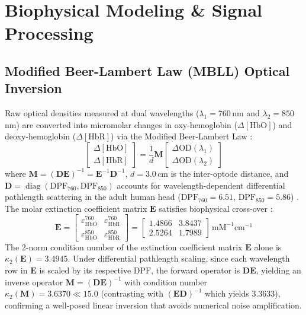 \documentclass[journal]{IEEEtran}
\begin{document}
\section{Biophysical Modeling \& Signal Processing}

\subsection{Modified Beer-Lambert Law (MBLL) Optical Inversion}
Raw optical densities measured at dual wavelengths ($\lambda_1 = 760$\,nm and $\lambda_2 = 850$\,nm) are converted into micromolar changes in oxy-hemoglobin ($\Delta[\text{HbO}]$) and deoxy-hemoglobin ($\Delta[\text{HbR}]$) via the Modified Beer-Lambert Law \cite{delpy1988estimation}:
\begin{equation}
\begin{bmatrix}
\Delta[\text{HbO}] \\
\Delta[\text{HbR}]
\end{bmatrix} = \frac{1}{d} \mathbf{M} \begin{bmatrix}
\Delta \text{OD}(\lambda_1) \\
\Delta \text{OD}(\lambda_2)
\end{bmatrix}
\end{equation}
where $\mathbf{M} = (\mathbf{D} \mathbf{E})^{-1} = \mathbf{E}^{-1} \mathbf{D}^{-1}$, $d = 3.0$\,cm is the inter-optode distance, and $\mathbf{D} = \operatorname{diag}(\text{DPF}_{760}, \text{DPF}_{850})$ accounts for wavelength-dependent differential pathlength scattering in the adult human head ($\text{DPF}_{760} = 6.51$, $\text{DPF}_{850} = 5.86$) \cite{duncan1995measurement, scholkmann2013general}. The molar extinction coefficient matrix $\mathbf{E}$ satisfies biophysical cross-over \cite{cope1991system}:
\begin{equation}
\mathbf{E} = \begin{bmatrix}
\varepsilon_{\text{HbO}}^{760} & \varepsilon_{\text{HbR}}^{760} \\
\varepsilon_{\text{HbO}}^{850} & \varepsilon_{\text{HbR}}^{850}
\end{bmatrix} = \begin{bmatrix}
1.4866 & 3.8437 \\
2.5264 & 1.7989
\end{bmatrix}\,\text{mM}^{-1}\text{cm}^{-1}
\end{equation}
The 2-norm condition number of the extinction coefficient matrix $\mathbf{E}$ alone is $\kappa_2(\mathbf{E}) = 3.4945$. Under differential pathlength scaling, since each wavelength row in $\mathbf{E}$ is scaled by its respective $\text{DPF}$, the forward operator is $\mathbf{D}\mathbf{E}$, yielding an inverse operator $\mathbf{M} = (\mathbf{D} \mathbf{E})^{-1}$ with condition number $\kappa_2(\mathbf{M}) = 3.6370 \ll 15.0$ (contrasting with $(\mathbf{E}\mathbf{D})^{-1}$ which yields $3.3633$), confirming a well-posed linear inversion that avoids numerical noise amplification.
\end{document}

